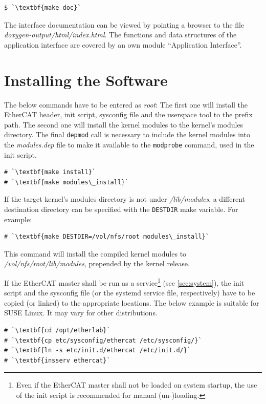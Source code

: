 \documentclass[a4paper,12pt,BCOR6mm,bibtotoc,idxtotoc]{scrbook}
\begin{document}
\begin{lstlisting}
$ `\textbf{make doc}`
\end{lstlisting}

The interface documentation can be viewed by pointing a browser to the file
\textit{doxygen-output/html/index.html}. The functions and data structures of
the application interface are covered by an own module ``Application
Interface''.

\section{Installing the Software}

The below commands have to be entered as \textit{root}: The first one will
install the EtherCAT header, init script, sysconfig file and the userspace
tool to the prefix path. The second one will install the kernel modules to the
kernel's modules directory. The final \lstinline+depmod+ call is necessary to
include the kernel modules into the \textit{modules.dep} file to make it
available to the \lstinline+modprobe+ command, used in the init script.

\begin{lstlisting}
# `\textbf{make install}`
# `\textbf{make modules\_install}`
\end{lstlisting}

If the target kernel's modules directory is not under \textit{/lib/modules}, a
different destination directory can be specified with the \lstinline+DESTDIR+
make variable. For example:

\begin{lstlisting}
# `\textbf{make DESTDIR=/vol/nfs/root modules\_install}`
\end{lstlisting}

This command will install the compiled kernel modules to
\textit{/vol/nfs/root/lib/modules}, prepended by the kernel release.

If the EtherCAT master shall be run as a service\footnote{Even if the EtherCAT
master shall not be loaded on system startup, the use of the init script is
recommended for manual (un-)loading.} (see \autoref{sec:system}), the init
script and the sysconfig file (or the systemd service file, respectively) have
to be copied (or linked) to the appropriate locations. The below example is
suitable for SUSE Linux. It may vary for other distributions.

\begin{lstlisting}
# `\textbf{cd /opt/etherlab}`
# `\textbf{cp etc/sysconfig/ethercat /etc/sysconfig/}`
# `\textbf{ln -s etc/init.d/ethercat /etc/init.d/}`
# `\textbf{insserv ethercat}`
\end{lstlisting}
\end{document}
